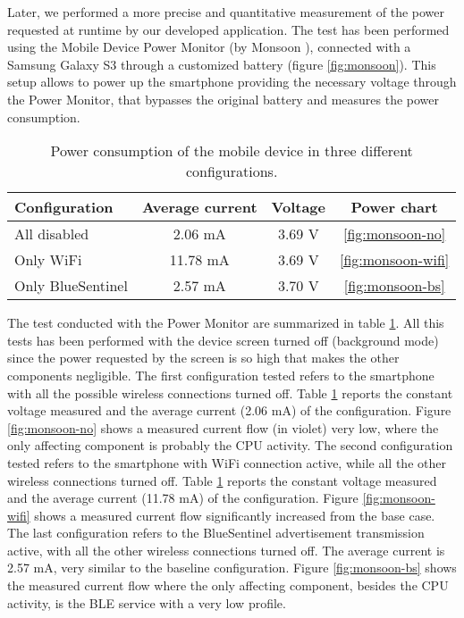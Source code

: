 Later, we performed a more precise and quantitative measurement of the power requested at runtime by our developed application.
The test has been performed using the Mobile Device Power Monitor (by Monsoon \textregistered), connected with a Samsung Galaxy S3 through a customized battery (figure \ref{fig:monsoon}). This setup allows to power up the smartphone providing the necessary voltage through the Power Monitor, that bypasses the original battery and measures the power consumption.


\begin{table}[h!tb]
\center
\caption{Power consumption of the mobile device in three different configurations.}
\label{tab:monsoon}
\begin{tabular}{|l|c|c|c|}
  \hline
  \textbf{Configuration} & \textbf{Average current} & \textbf{Voltage} & \textbf{Power chart}\\
  \hline
  All disabled & 2.06 mA & 3.69 V & \ref{fig:monsoon-no} \\
  Only WiFi & 11.78 mA & 3.69 V & \ref{fig:monsoon-wifi} \\
  Only BlueSentinel & 2.57 mA & 3.70 V & \ref{fig:monsoon-bs} \\
  \hline
\end{tabular}
\end{table}

The test conducted with the Power Monitor are summarized in table \ref{tab:monsoon}. All this tests has been performed with the device screen turned off (background mode) since the power requested by the screen is so high that makes the other components negligible. The first configuration tested refers to the smartphone with all the possible wireless connections turned off. Table \ref{tab:monsoon} reports the constant voltage measured and the average current (2.06 mA) of the configuration. Figure \ref{fig:monsoon-no} shows a measured current flow (in violet) very low, where the only affecting component is probably the CPU activity.
The second configuration tested refers to the smartphone with WiFi connection active, while all the other wireless connections turned off. Table \ref{tab:monsoon} reports the constant voltage measured and the average current (11.78 mA) of the configuration. Figure \ref{fig:monsoon-wifi} shows a measured current flow significantly increased from the base case. The last configuration refers to the BlueSentinel advertisement transmission active, with all the other wireless connections turned off. The average current is 2.57 mA, very similar to the baseline configuration. Figure \ref{fig:monsoon-bs} shows the measured current flow where the only affecting component, besides the CPU activity, is the BLE service with a very low profile.

